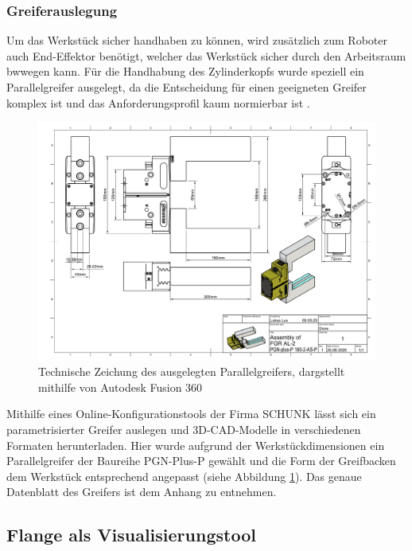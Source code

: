 \subsubsection{Greiferauslegung}

Um das Werkstück sicher handhaben zu können, wird zusätzlich zum Roboter auch
End-Effektor benötigt, welcher das Werkstück sicher durch den Arbeitsraum
bwwegen kann. Für die Handhabung des Zylinderkopfs wurde speziell ein Parallelgreifer
ausgelegt, da die Entscheidung für einen geeigneten Greifer komplex ist und das
Anforderungsprofil kaum normierbar ist .\\


\begin{figure}[H]
	\centering
	\includegraphics[width=\linewidth]{Figures/SchunkGreifer-1.png}
	\caption{Technische Zeichung des ausgelegten Parallelgreifers, dargstellt
		mithilfe von Autodesk Fusion 360}
	\label{figure:schunkGripper}
\end{figure}

\noindent Mithilfe eines Online-Konfigurationstools der Firma
SCHUNK lässt sich ein parametrisierter Greifer auslegen und
3D-CAD-Modelle in verschiedenen Formaten herunterladen. Hier wurde aufgrund der
Werkstückdimensionen ein Parallelgreifer der Baureihe PGN-Plus-P gewählt und die
Form der Greifbacken dem Werkstück entsprechend angepasst (siehe Abbildung
\ref{figure:schunkGripper}).
Das genaue Datenblatt des Greifers ist dem Anhang zu entnehmen.

\subsection{Flange als Visualisierungstool}


